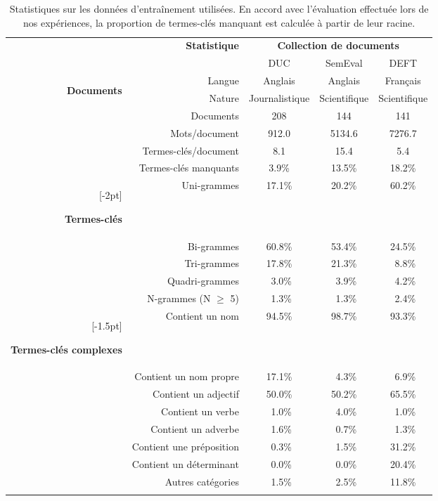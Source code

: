     \begin{table}
      \centering
      \begin{tabular}{@{~~}rrccc@{~~}}
        \toprule
        & \multirow{2}{*}[-2pt]{\textbf{Statistique}} & \multicolumn{3}{c}{\textbf{Collection de documents}}\\
        \cmidrule{3-5}
        & & DUC & SemEval & DEFT\\
        \midrule
        \multirow{6}{*}[-2pt]{\begin{sideways}\textbf{Documents}\end{sideways}} & Langue & Anglais & Anglais & Français\\
        & Nature & Journalistique & Scientifique & Scientifique\\
        & Documents & 208 & 144 & 141\\
        & Mots/document & 912.0 & 5134.6 & 7276.7\\
        & Termes-clés/document & 8.1 & 15.4 & 5.4\\
        & Termes-clés manquants & 3.9\% & 13.5\% & 18.2\%\\
        \addlinespace[1.5\defaultaddspace]
        \multirow{5}{*}[-2pt]{\begin{sideways}\textbf{Termes-clés}\end{sideways}} & Uni-grammes & 17.1\% & 20.2\% & 60.2\%\\
        & Bi-grammes & 60.8\% & 53.4\% & 24.5\%\\
        & Tri-grammes & 17.8\% & 21.3\% & $~~$8.8\%\\
        & Quadri-grammes & $~~$3.0\% & $~~$3.9\% & $~~$4.2\%\\
        & N-grammes (N $\geq$ 5) & $~~$1.3\% & $~~$1.3\% & $~~$2.4\%\\
        \addlinespace[1.5\defaultaddspace]
        \multirow{8}{*}[-1.5pt]{\begin{sideways}\textbf{Termes-clés complexes}\end{sideways}} & Contient un nom & 94.5\% & 98.7\% & 93.3\%\\
        & Contient un nom propre & 17.1\% & $~~$4.3\% & $~~$6.9\%\\
        & Contient un adjectif & 50.0\% & 50.2\% & 65.5\%\\
        & Contient un verbe & $~~$1.0\% & $~~$4.0\% & $~~$1.0\%\\
        & Contient un adverbe & $~~$1.6\% & $~~$0.7\% & $~~$1.3\%\\
        & Contient une préposition & $~~$0.3\% & $~~$1.5\% & 31.2\%\\
        & Contient un déterminant & $~~$0.0\% & $~~$0.0\% & 20.4\%\\
        & Autres catégories & $~~$1.5\% & $~~$2.5\% & 11.8\%\\
        \addlinespace[.5\defaultaddspace]
        \bottomrule
      \end{tabular}
      \caption{Statistiques sur les données d'entraînement utilisées. En accord
               avec l'évaluation effectuée lors de nos expériences, la
               proportion de termes-clés manquant est calculée à partir de leur
               racine. \label{tab:donnees_d_entrainement}}
    \end{table}


